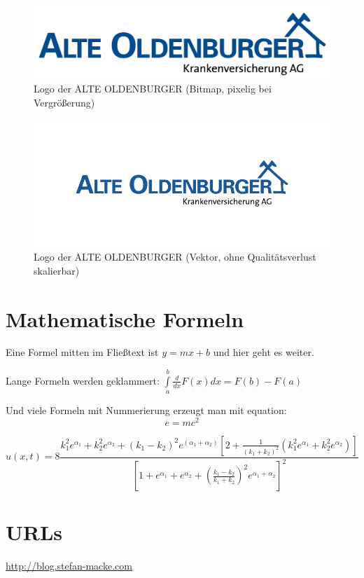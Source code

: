 \begin{figure}[htb]
\caption{Logo der ALTE OLDENBURGER (Bitmap, pixelig bei Vergrößerung)}
\includegraphics[scale=0.3]{Bilder/LogoAO.jpg}
\end{figure}
\begin{figure}[htb]
\caption{Logo der ALTE OLDENBURGER (Vektor, ohne Qualitätsverlust skalierbar)}
\includegraphics[scale=0.8]{Bilder/LogoAO.pdf}
\end{figure}

\section{Mathematische Formeln}

Eine Formel mitten im Fließtext ist $y=mx+b$ und hier geht es weiter.

Lange Formeln werden geklammert:
\( \int\limits_a^b {\frac{d}{dx}F(x)dx} = F(b)-F(a) \)

Und viele Formeln mit Nummerierung erzeugt man mit equation:
\begin{equation}
e=mc^2
\end{equation}

\begin{equation}
u(x,t)= 8 \frac{k_{1}^{2}e^{\alpha_{1}} + k_{2}^{2}e^{\alpha_{2}} + (k_{1}-k_{2})^{2}e^{(\alpha_{1}+ \alpha_{2})} \left[2 + \frac{1}{(k_{1} + k_{2})^{2}} ( k_{1}^{2}e^{\alpha_{1}} + k_{2}^{2}e^{\alpha_{2}}) \right]}{\left[1+e^{\alpha_{1}} + e^{\alpha_{2}} + \left(\frac{k_{1} - k_{2}}{k_{1}+k_{2}} \right)^{2} e^{\alpha_{1}+ \alpha_{2}} \right]^{2}}
\end{equation}

\section{URLs}
\url{http://blog.stefan-macke.com}